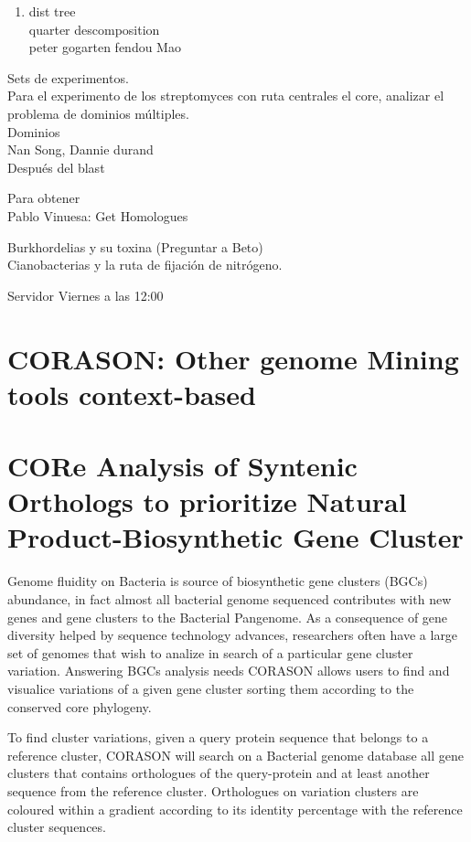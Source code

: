 \documentclass[12pt,twoside]{reedthesis}
\providecommand{\tightlist}{%
  \setlength{\itemsep}{0pt}\setlength{\parskip}{0pt}}
\begin{document}
  \begin{enumerate}
  \def\labelenumi{\arabic{enumi}.}
  \setcounter{enumi}{1}
  \tightlist
  \item
    dist tree\\
    quarter descomposition\\
    peter gogarten fendou Mao
  \end{enumerate}
  
  Sets de experimentos.\\
  Para el experimento de los streptomyces con ruta centrales el core,
  analizar el problema de dominios múltiples.\\
  Dominios\\
  Nan Song, Dannie durand\\
  Después del blast
  
  Para obtener\\
  Pablo Vinuesa: Get Homologues
  
  Burkhordelias y su toxina (Preguntar a Beto)\\
  Cianobacterias y la ruta de fijación de nitrógeno.
  
  Servidor Viernes a las 12:00
  
  \section{CORASON: Other genome Mining tools
  context-based}\label{corason-other-genome-mining-tools-context-based}
  
  \section{CORe Analysis of Syntenic Orthologs to prioritize Natural
  Product-Biosynthetic Gene
  Cluster}\label{core-analysis-of-syntenic-orthologs-to-prioritize-natural-product-biosynthetic-gene-cluster}
  
  Genome fluidity on Bacteria is source of biosynthetic gene clusters
  (BGCs) abundance, in fact almost all bacterial genome sequenced
  contributes with new genes and gene clusters to the Bacterial Pangenome.
  As a consequence of gene diversity helped by sequence technology
  advances, researchers often have a large set of genomes that wish to
  analize in search of a particular gene cluster variation. Answering BGCs
  analysis needs CORASON allows users to find and visualice variations of
  a given gene cluster sorting them according to the conserved core
  phylogeny.
  
  To find cluster variations, given a query protein sequence that belongs
  to a reference cluster, CORASON will search on a Bacterial genome
  database all gene clusters that contains orthologues of the
  query-protein and at least another sequence from the reference cluster.
  Orthologues on variation clusters are coloured within a gradient
  according to its identity percentage with the reference cluster
  sequences.
  
\end{document}
